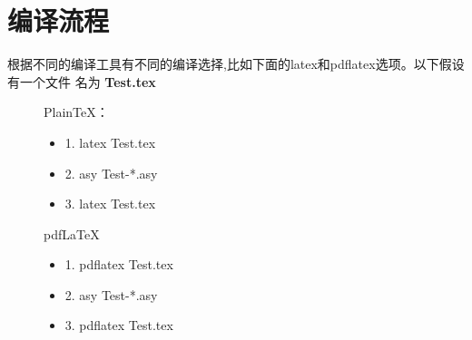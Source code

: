 \documentclass[fontset=windows, 12pt]{article}
\begin{document}
\section{编译流程}
根据不同的编译工具有不同的编译选择,比如下面的latex和pdflatex选项。以下假设有一个文件
名为 \textbf{Test.tex}
\begin{figure}[!htb]
    \begin{minipage}[t]{0.4\linewidth}
        \vspace*{0pt}
        \begin{tcolorbox}[colback=blue!5!white,colframe=blue!75!black,title=流程一]
            PlainTeX：
            \begin{itemize}
                \item 1. latex Test.tex
                \item 2. asy Test-*.asy
                \item 3. latex Test.tex
            \end{itemize}
        \end{tcolorbox}
    \end{minipage}
    \hfill
    \begin{minipage}[t]{0.6\linewidth}
        \vspace*{0pt}
        \begin{tcolorbox}[colback=blue!5!white,colframe=blue!75!black,title=流程二]
            pdfLaTeX
            \begin{itemize}
                \item 1. pdflatex Test.tex
                \item 2. asy Test-*.asy
                \item 3. pdflatex Test.tex
            \end{itemize}  
        \end{tcolorbox}
    \end{minipage}
\end{figure}
\end{document}
